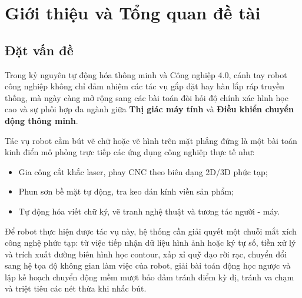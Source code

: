 \documentclass[a4paper,12pt]{article}
\begin{document}
\newpage
{}
\tableofcontents
\newpage
\listoffigures
\listoftables
\lstlistoflistings
\newpage
{}

\section{Giới thiệu và Tổng quan đề tài}

\subsection{Đặt vấn đề}
Trong kỷ nguyên tự động hóa thông minh và Công nghiệp 4.0, cánh tay robot công nghiệp không chỉ đảm nhiệm các tác vụ gắp đặt hay hàn lắp ráp truyền thống, mà ngày càng mở rộng sang các bài toán đòi hỏi độ chính xác hình học cao và sự phối hợp đa ngành giữa \textbf{Thị giác máy tính} và \textbf{Điều khiển chuyển động thông minh}.

Tác vụ robot cầm bút vẽ chữ hoặc vẽ hình trên mặt phẳng đứng là một bài toán kinh điển mô phỏng trực tiếp các ứng dụng công nghiệp thực tế như:
\begin{itemize}[noitemsep]
    \item Gia công cắt khắc laser, phay CNC theo biên dạng 2D/3D phức tạp;
    \item Phun sơn bề mặt tự động, tra keo dán kính viền sản phẩm;
    \item Tự động hóa viết chữ ký, vẽ tranh nghệ thuật và tương tác người - máy.
\end{itemize}

Để robot thực hiện được tác vụ này, hệ thống cần giải quyết một chuỗi mắt xích công nghệ phức tạp: từ việc tiếp nhận dữ liệu hình ảnh hoặc ký tự số, tiền xử lý và trích xuất đường biên hình học contour, xấp xỉ quỹ đạo rời rạc, chuyển đổi sang hệ tọa độ không gian làm việc của robot, giải bài toán động học ngược và lập kế hoạch chuyển động mềm mượt bảo đảm tránh điểm kỳ dị, tránh va chạm và triệt tiêu các nét thừa khi nhấc bút.
\end{document}
